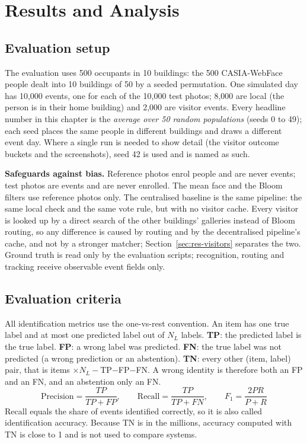 \documentclass[12pt,a4paper,oneside]{report}
\begin{document}
\clearpage
\chapter{Results and Analysis}
\label{ch:results}
\section{Evaluation setup}
The evaluation uses 500 occupants in 10 buildings: the 500 CASIA-WebFace people dealt into 10 buildings of 50 by a seeded permutation. One simulated day has 10,000 events, one for each of the 10,000 test photos; 8,000 are local (the person is in their home building) and 2,000 are visitor events. Every headline number in this chapter is the \emph{average over 50 random populations} (seeds 0 to 49); each seed places the same people in different buildings and draws a different event day. Where a single run is needed to show detail (the visitor outcome buckets and the screenshots), seed 42 is used and is named as such.



\textbf{Safeguards against bias.} Reference photos enrol people and are never events; test photos are events and are never enrolled. The mean face and the Bloom filters use reference photos only. The centralised baseline is the same pipeline: the same local check and the same vote rule, but with no visitor cache. Every visitor is looked up by a direct search of the other buildings' galleries instead of Bloom routing, so any difference is caused by routing and by the decentralised pipeline's cache, and not by a stronger matcher; Section~\ref{sec:res-visitors} separates the two. Ground truth is read only by the evaluation scripts; recognition, routing and tracking receive observable event fields only.

\section{Evaluation criteria}
All identification metrics use the one-vs-rest convention. An item has one true label and at most one predicted label out of $N_L$ labels. \textbf{TP}: the predicted label is the true label. \textbf{FP}: a wrong label was predicted. \textbf{FN}: the true label was not predicted (a wrong prediction or an abstention). \textbf{TN}: every other (item, label) pair, that is items $\times N_L-$TP$-$FP$-$FN. A wrong identity is therefore both an FP and an FN, and an abstention only an FN.
\begin{equation}
\mathrm{Precision}=\frac{TP}{TP+FP},\qquad \mathrm{Recall}=\frac{TP}{TP+FN},\qquad F_1=\frac{2PR}{P+R}
\end{equation}
Recall equals the share of events identified correctly, so it is also called identification accuracy. Because TN is in the millions, accuracy computed with TN is close to 1 and is not used to compare systems.
\end{document}
